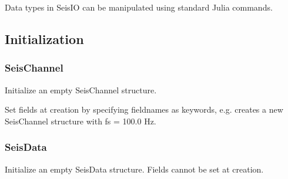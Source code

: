 \documentclass[letterpaper,11pt,english]{sphinxmanual}
\begin{document}
Data types in SeisIO can be manipulated using standard Julia commands.


\subsection{Initialization}
\label{\detokenize{src/seisdata:initialization}}

\subsubsection{SeisChannel}
\label{\detokenize{src/seisdata:seischannel}}

\begin{fulllineitems}
\label{\detokenize{src/seisdata:SeisChannel}}
\end{fulllineitems}


Initialize an empty SeisChannel structure.

\begin{fulllineitems}
\end{fulllineitems}


Set fields at creation by specifying fieldnames as keywords, e.g.  creates a new SeisChannel structure with fs = 100.0 Hz.


\subsubsection{SeisData}
\label{\detokenize{src/seisdata:id1}}

\begin{fulllineitems}
\label{\detokenize{src/seisdata:SeisData}}
\end{fulllineitems}


Initialize an empty SeisData structure. Fields cannot be set at creation.

\begin{fulllineitems}
\end{fulllineitems}
\end{document}
